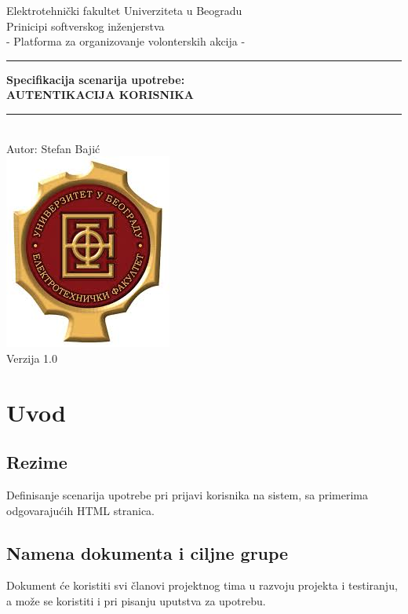 \documentclass[11pt,a4paper]{article}
\begin{document}
\begin{titlepage}

\centering
\textnormal{\large Elektrotehnički fakultet Univerziteta u Beogradu}\\[0.1cm]
\textnormal{\large Prinicipi softverskog inženjerstva}\\[3cm]

\textnormal{\normalsize - Platforma za organizovanje volonterskih akcija -}\\\vspace{-5mm}
\rule{\textwidth}{0.4pt}
{\huge \bfseries Specifikacija scenarija upotrebe:\\ 
AUTENTIKACIJA KORISNIKA\par}\vspace{-1mm}
\rule{\textwidth}{0.4pt}\\\vspace{1mm}
\textnormal{\large Autor: Stefan Bajić}\\[6cm]

\includegraphics[scale=0.5]{logo.jpg}\\
\vfill
\textnormal{\normalsize Verzija 1.0}\\

\end{titlepage}

\tableofcontents

\newpage

\section{Uvod}
\subsection{Rezime}
Definisanje scenarija upotrebe pri prijavi korisnika na sistem, sa primerima odgovarajućih HTML stranica.
\subsection{Namena dokumenta i ciljne grupe}
Dokument će koristiti svi članovi projektnog tima u razvoju projekta i testiranju, a može se koristiti i pri pisanju uputstva za upotrebu.
\end{document}
